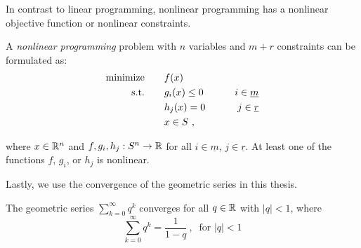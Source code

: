 In contrast to linear programming, nonlinear programming has a nonlinear objective function or nonlinear constraints.
\begin{definition}
    A \textit{nonlinear programming} problem with $n$ variables and $m+r$ constraints can be formulated as:
    \begin{align}
        \text{minimize} \qquad & f(x) \notag \\
        \text{s.t.} \qquad & g_i(x) \leq 0 \qquad & i \in \underline{m} \notag \\
        & h_j(x) = 0 \qquad & j \in \underline{r} \notag \\
        & x \in S\ ,\notag
    \end{align}
    
    where $x \in \mathbb{R}^n$ and $f,g_i,h_j: S^n \rightarrow \mathbb{R}$ for all $i\in\underline{m}$, $j\in\underline{r}$. At least one of the functions $f$, $g_i$, or $h_j$ is nonlinear.
\end{definition}

Lastly, we use the convergence of the geometric series in this thesis.
\begin{definition}
    The geometric series $\sum_{k=0}^\infty q^k$ converges for all $q\in\mathbb{R}$ with $|q|<1$, where
    \[\sum_{k=0}^\infty q^k=\frac{1}{1-q}\ ,\ \text{ for } |q|<1\]
\end{definition}

